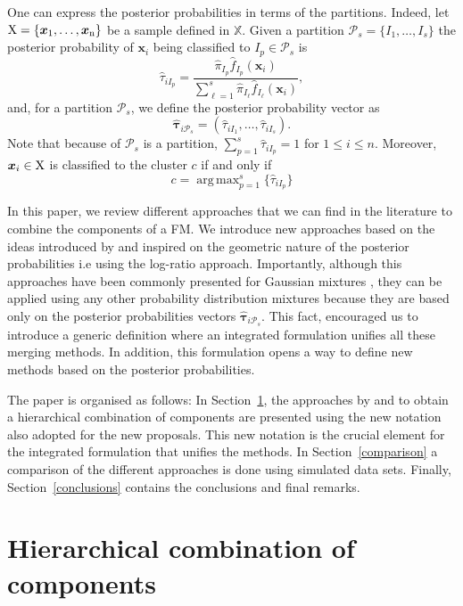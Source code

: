 \documentclass[10pt, a4paper]{article}
\DeclareMathOperator*{\argmax}{arg\,max}
\newcommand{\m}[1]{\boldsymbol{#1}}
\begin{document}
\begin{spacing}{1.9}
One can express the posterior probabilities in terms of the partitions. Indeed, let $\rm X = \{\m x_1,\dots, \m x_n\}$ be a sample defined in $\mathbb{X}$. Given a partition $\mathcal{P}_s = \{ I_1, \dots, I_s \}$ the posterior probability of $\m x_i$ being classified to $I_p\in \mathcal{P}_{s}$ is
\[
\hat{\tau}_{i I_p} =  \frac{ \hat{\pi}_{I_p} \hat{f}_{I_p}(\m x_i) }{\sum_{\ell=1}^s \hat{\pi}_{I_\ell} \hat{f}_{I_\ell}(\m x_i)},
\]
and, for a partition  $\mathcal{P}_s$, we define the posterior probability vector as
\[
\hat{\m\tau}_{i \mathcal{P}_s} = \left( \hat{\tau}_{i I_1} , \dots, \hat{\tau}_{i I_s}  \right).
\]
Note that because of $\mathcal{P}_s$ is a partition, $\sum_{p=1}^s \hat{\tau}_{i I_p} = 1$ for $1 \leq i \leq n$.
Moreover, $\m x_i \in \rm X$ is classified to the cluster $c$ if and only if
\begin{equation}\label{cluster_criteria}
c= \argmax_{p=1}^s \{ \hat{\tau}_{i I_p} \}
\end{equation}


In this paper, we review different approaches that we can find in the literature \citep{baudry2010combining, hennig2010methods} to combine the components of a FM. We introduce new approaches based on the ideas introduced by \cite{longford2014} and inspired on the geometric nature of the posterior probabilities i.e using the log-ratio approach. Importantly, although this approaches have been commonly presented for Gaussian mixtures \citep{longford2014,melnykov2013distribution,hennig2010methods,baudry2010combining}, they can be applied using any other probability distribution mixtures because they are based only on the posterior probabilities vectors $\hat{\m\tau}_{i \mathcal{P}_s}$. This fact, encouraged us to introduce a generic definition where an integrated formulation unifies all these merging methods. In addition, this formulation opens a way to define new methods based on the posterior probabilities.

The paper is organised as follows: In Section~\ref{old_methods}, the approaches by \cite{hennig2010methods} and \cite{baudry2010combining} to obtain a hierarchical combination of components are presented using the new notation also adopted for the new proposals. This new notation is the crucial element for the integrated formulation that unifies the methods. In Section~\ref{comparison} a comparison of the different approaches is done using simulated data sets. Finally, Section~\ref{conclusions} contains the conclusions and final remarks.


\section{Hierarchical combination of components}
\label{old_methods}



\end{spacing}
\end{document}

